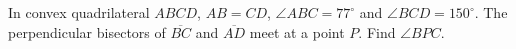 In convex quadrilateral $ABCD$, $AB=CD$, $\angle ABC=77^\circ$ and $\angle BCD=150^\circ$. The perpendicular bisectors of $\overline{BC}$ and $\overline{AD}$ meet at a point $P$. Find $\angle BPC$.
